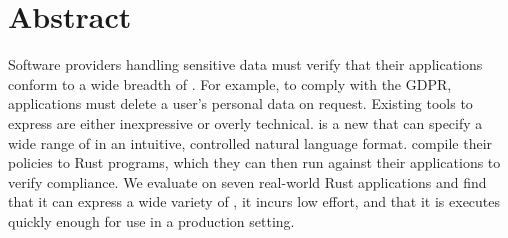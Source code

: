 \chapter*{Abstract}

%
Software providers handling sensitive data must verify that their applications conform to a wide breadth of \policies.
%
For example, to comply with the GDPR, applications must delete a user's personal data on request.
% 
Existing tools to express \policies{} are either inexpressive or overly technical.
%
\syslang{} is a new \policylang{} that can specify a wide range of \policies{} in an intuitive, 
controlled natural language format.
%
\Devs{} compile their \syslang{} policies to Rust programs,
which they can then run against their applications to verify compliance.
%
We evaluate \syslang{} on seven real-world Rust applications and find that it can
express a wide variety of \policies{}, 
it incurs low \dev{} effort,
and that it is executes quickly enough for use in a production setting.
